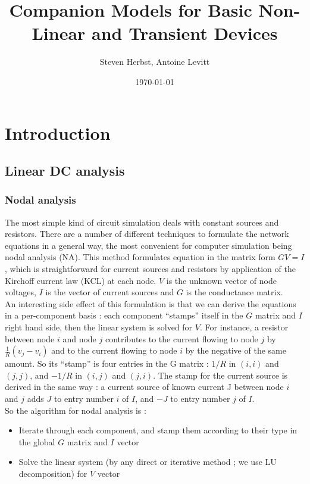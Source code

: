\documentclass{article}
\begin{document}
\title{Companion Models for Basic Non-Linear and Transient Devices}
\author{Steven Herbst, Antoine Levitt}
\date{\today}

\maketitle

\section{Introduction}
\subsection{Linear DC analysis}
\subsubsection{Nodal analysis}
The most simple kind of circuit simulation deals with constant sources and resistors. There are a number of different techniques to formulate the network equations in a general way, the most convenient for computer simulation being nodal analysis (NA). This method formulates equation in the matrix form $GV = I$, which is straightforward for current sources and resistors by application of the Kirchoff current law (KCL) at each node. $V$ is the unknown vector of node voltages, $I$ is the vector of current sources and $G$ is the conductance matrix.\\
An interesting side effect of this formulation is that we can derive the equations in a per-component basis : each component ``stamps'' itself in the $G$ matrix and $I$ right hand side, then the linear system is solved for $V$. For instance, a resistor between node $i$ and node $j$ contributes to the current flowing to node $j$ by $\frac{1}{R} (v_j - v_i)$ and to the current flowing to node $i$ by the negative of the same amount. So its ``stamp'' is four entries in the G matrix : $1/R$ in $(i,i)$ and $(j,j)$, and $-1/R$ in $(i,j)$ and $(j,i)$. The stamp for the current source is derived in the same way : a current source of known current J between node $i$ and $j$ adds $J$ to entry number $i$ of $I$, and $-J$ to entry number $j$ of $I$.\\
So the algorithm for nodal analysis is :
\begin{itemize}
\item Iterate through each component, and stamp them according to their type in the global $G$ matrix and $I$ vector
\item Solve the linear system (by any direct or iterative method ; we use LU decomposition) for $V$ vector
\end{itemize}
\end{document}
